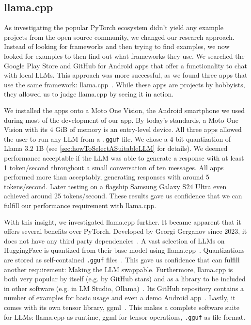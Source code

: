 \subsection{llama.cpp}
\label{sec:llamaCpp}
As investigating the popular PyTorch ecosystem didn't yield any example projects from the open source community, we changed our research approach. Instead of looking for frameworks and then trying to find examples, we now looked for examples to then find out what frameworks they use. We searched the Google Play Store and GitHub for Android apps that offer a functionality to chat with local \glspl{LLM}. This approach was more successful, as we found three apps that use the same framework: llama.cpp~\cite{panchalShubham0204SmolChatAndroid2025,vali-98Vali98ChatterUI2025,ghorbaniAghorbaniPocketpalai2025}. While these apps are projects by hobbyists, they allowed us to judge llama.cpp by seeing it in action.

We installed the apps onto a Moto One Vision, the Android smartphone we used during most of the development of our app. By today's standards, a Moto One Vision with its 4 GiB of memory is an entry-level device. All three apps allowed the user to run any \gls{LLM} from a \lstinline|.gguf| file. We chose a 4 bit quantization of Llama 3.2 1B (see \cref{sec:howToSelectASuitableLLM} for details). We deemed performance acceptable if the \gls{LLM} was able to generate a response with at least 1 token/second throughout a small conversation of ten messages. All apps performed more than acceptably, generating responses with around 5 tokens/second. Later testing on a flagship Samsung Galaxy S24 Ultra even achieved around 25 tokens/second. These results gave us confidence that we can fulfill our performance requirement with llama.cpp.

With this insight, we investigated llama.cpp further. It became apparent that it offers several benefits over PyTorch. Developed by Georgi Gerganov since 2023, it does not have any third party dependencies~\cite{gerganovGgerganovLlamacpp2024}. A vast selection of \glspl{LLM} on HuggingFace is quantized from their base model using llama.cpp~\cite{huggingfaceModelsHuggingFace2025}. Quantizations are stored as self-contained \lstinline|.gguf| files~\cite{huggingfaceGGUF}. This gave us confidence that can fulfill another requirement: Making the \gls{LLM} swappable. Furthermore, llama.cpp is both very popular by itself (e.g. by GitHub stars) and as a library to be included in other software (e.g. in LM Studio, Ollama)~\cite{gerganovGgerganovLlamacpp2024}. Its GitHub repository contains a number of examples for basic usage and even a demo Android app~\cite{gerganovGgerganovLlamacpp2024}. Lastly, it comes with its own tensor library, ggml~\cite{gerganovGgerganovGgml2024}. This makes a complete software suite for \glspl{LLM}: llama.cpp as runtime, ggml for tensor operations, \lstinline|.gguf| as file format.

